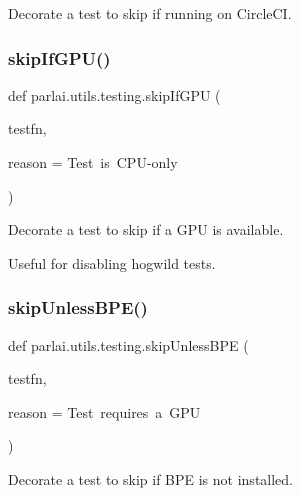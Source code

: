 \begin{DoxyVerb}Decorate a test to skip if running on CircleCI.
\end{DoxyVerb}
 \mbox{\label{namespaceparlai_1_1utils_1_1testing_a2d3bb5013e210bf866032aedc812859b}} 
\subsubsection{\texorpdfstring{skip\+If\+G\+P\+U()}{skipIfGPU()}}
{\footnotesize\ttfamily def parlai.\+utils.\+testing.\+skip\+If\+G\+PU (\begin{DoxyParamCaption}\item[{}]{testfn,  }\item[{}]{reason = {\ttfamily \textquotesingle{}Test~is~CPU-\/only\textquotesingle{}} }\end{DoxyParamCaption})}

\begin{DoxyVerb}Decorate a test to skip if a GPU is available.

Useful for disabling hogwild tests.
\end{DoxyVerb}
 \mbox{\label{namespaceparlai_1_1utils_1_1testing_ab04af7a525a569f29b936b54b32899b7}} 
\subsubsection{\texorpdfstring{skip\+Unless\+B\+P\+E()}{skipUnlessBPE()}}
{\footnotesize\ttfamily def parlai.\+utils.\+testing.\+skip\+Unless\+B\+PE (\begin{DoxyParamCaption}\item[{}]{testfn,  }\item[{}]{reason = {\ttfamily \textquotesingle{}Test~requires~a~GPU\textquotesingle{}} }\end{DoxyParamCaption})}

\begin{DoxyVerb}Decorate a test to skip if BPE is not installed.
\end{DoxyVerb}
 \mbox{\label{namespaceparlai_1_1utils_1_1testing_a2773d8b6d4631fa1f639dde415eb3e2b}} 
